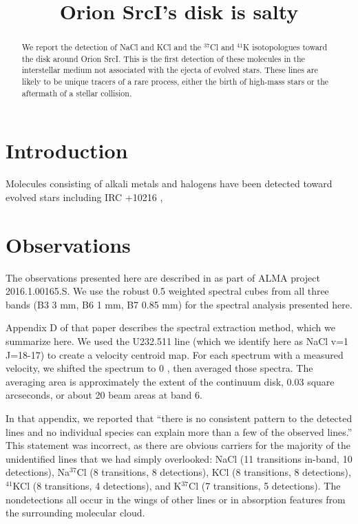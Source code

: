 \documentclass[twocolumn]{aastex62}
\newcommand{\sourcei}{SrcI\xspace}
\begin{document}


\title{Orion \sourcei's disk is salty}
\begin{abstract}
    We report the detection of NaCl and KCl and the $^{37}$Cl and $^{41}$K
    isotopologues toward the disk around Orion \sourcei.
    This is the first detection of these molecules in the interstellar
    medium not associated with the ejecta of evolved stars.
    These lines are likely to be unique tracers of a rare process, either
    the birth of high-mass stars or the aftermath of a stellar collision.
\end{abstract}

\section{Introduction}
Molecules consisting of alkali metals and halogens have been detected
toward evolved stars including IRC +10216 \citep{Cernicharo1987a}, 


\section{Observations}
The observations presented here are described in \citet{Ginsburg2018a} as part
of ALMA project 2016.1.00165.S.  We use the robust 0.5 weighted spectral cubes
from all three bands (B3 3 mm, B6 1 mm, B7 0.85 mm) for the spectral analysis
presented here.

Appendix D of that paper describes the spectral extraction method,
which we summarize here.  We used the U232.511 line (which we identify here as
NaCl v=1 J=18-17) to create a velocity centroid map.  For each spectrum with
a measured velocity, we shifted the spectrum to 0 \kms, then averaged those
spectra.  The averaging area is approximately the extent of the continuum
disk, 0.03 square arcseconds, or about 20 beam areas at band 6.

In that appendix, we reported that ``there is no consistent pattern to the
detected lines and no individual species can explain more than a few of the
observed lines.''  This statement was incorrect, as there are obvious carriers
for the majority of the unidentified lines that we had simply overlooked:
NaCl (11 transitions in-band, 10 detections), Na$^{37}$Cl (8 transitions, 8
detections), KCl (8 transitions, 8 detections), $^{41}$KCl (8 transitions, 4
detections), and K$^{37}$Cl (7 transitions, 5 detections).
The nondetections all occur in the wings of other lines or in absorption
features from the surrounding molecular cloud.
\end{document}
